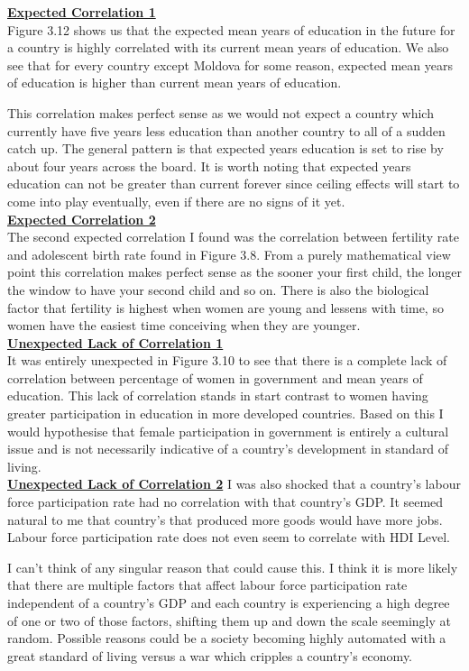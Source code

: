 \documentclass[11pt,a4paper,final]{article}
\begin{document}
\begin{multicols}{2}
\underline{\textbf{Expected Correlation 1}}
\\
Figure 3.12 shows us that the expected mean years of education in the future for a country is highly correlated with its current mean years of education. We also see that for every country except Moldova for some reason, expected mean years of education is higher than current mean years of education.

This correlation makes perfect sense as we would not expect a country which currently have five years less education than another country to all of a sudden catch up. The general pattern is that expected years education is set to rise by about four years across the board. It is worth noting that expected years education can not be greater than current forever since ceiling effects will start to come into play eventually, even if there are no signs of it yet.
\\
\underline{\textbf{Expected Correlation 2}}
\\
The second expected correlation I found was the correlation between fertility rate and adolescent birth rate found in Figure 3.8. From a purely mathematical view point this correlation makes perfect sense as the sooner your first child, the longer the window to have your second child and so on. There is also the biological factor that fertility is highest when women are young and lessens with time, so women have the easiest time conceiving when they are younger.
\\
\underline{\textbf{Unexpected Lack of Correlation 1}}
\\
It was entirely unexpected in Figure 3.10 to see that there is a complete lack of correlation between percentage of women in government and mean years of education. This lack of correlation stands in start contrast to women having greater participation in education in more developed countries. Based on this I would hypothesise that female participation in government is entirely a cultural issue and is not necessarily indicative of a country's development in standard of living.
\\
\underline{\textbf{Unexpected Lack of Correlation 2}}
I was also shocked that a country's labour force participation rate had no correlation with that country's GDP. It seemed natural to me that country's that produced more goods would have more jobs. Labour force participation rate does not even seem to correlate with HDI Level.

I can't think of any singular reason that could cause this. I think it is more likely that there are multiple factors that affect labour force participation rate independent of a country's GDP and each country is experiencing a high degree of one or two of those factors, shifting them up and down the scale seemingly at random. Possible reasons could be a society becoming highly automated with a great standard of living versus a war which cripples a country's economy.


\end{multicols}
\end{document}
